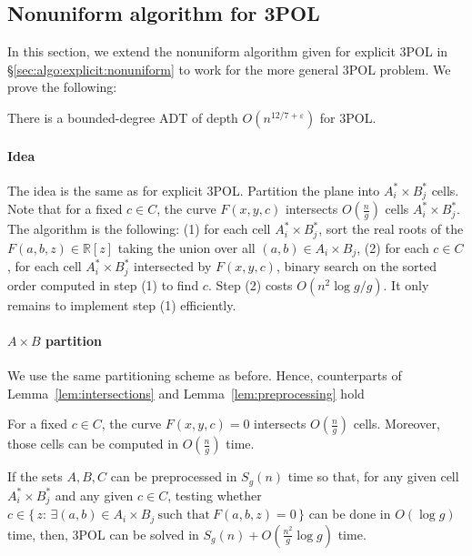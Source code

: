 \subsection{Nonuniform algorithm for 3POL}
\label{sec:algo:implicit:nonuniform}

In this section, we extend the nonuniform algorithm given for explicit 3POL in
\S\ref{sec:algo:explicit:nonuniform} to work for the more general 3POL
problem. We prove the following:
\begin{theorem}\label{thm:implicit:3POL}
    There is a bounded-degree ADT  of depth
    $O(n^{12/7+\varepsilon})$ for 3POL\@.
\end{theorem}

\paragraph{Idea}
The idea is the same as for explicit 3POL\@. Partition the plane
into $A^*_i \times B^*_j$ cells.
Note that for a fixed $c \in C$, the curve $F(x,y,c)$ intersects $O(\frac ng)$
cells $A^*_i \times B^*_j$. The algorithm is the following: (1) for each cell
$A^*_i \times B^*_j$, sort the real roots of the $F(a,b,z)
\in \mathbb{R}[z]$ taking the union over all $(a,b) \in A_i \times B_j$,
(2) for each $c \in C$,
for each cell $A^*_i \times B^*_j$ intersected by $F(x,y,c)$, binary search on
the sorted order computed in step (1) to find $c$. Step (2) costs $O(n^2
\log g / g)$. It only remains to implement step (1) efficiently.

\paragraph{$A \times B$ partition}
We use the same partitioning scheme as before. Hence, counterparts of
Lemma~\ref{lem:intersections}
and
Lemma~\ref{lem:preprocessing}
hold
\begin{lemma}\label{lem:intersections-implicit}
    For a fixed \(c \in C\), the curve $F(x,y,c)=0$ intersects $O(\frac ng)$ cells.
    Moreover, those cells can be computed in $O(\frac ng)$ time.
\end{lemma}
\begin{lemma}\label{lem:preprocessing-implicit}
    If the sets $A,B,C$ can be preprocessed in $S_g(n)$ time so that,
    for any given cell $A^*_i \times B^*_j$ and any given $c \in C$, testing whether
    $c \in \{\, z \colon\, \exists(a,b) \in A_i \times B_j~\text{such that}~F(a,b,z) = 0\,\}$
    can be done in
    $O(\log g)$ time, then, 3POL can be solved in
    $S_g(n)+O(\frac{n^2}{g}\log g)$ time.
\end{lemma}

